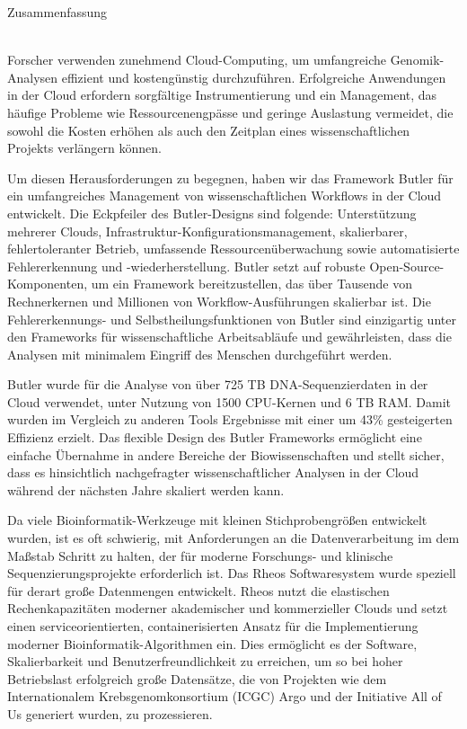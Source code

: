 \begin{Huge}
Zusammenfassung
\end{Huge}\\[1cm]
\noindent
Forscher verwenden zunehmend Cloud-Computing, um umfangreiche Genomik-Analysen effizient und kostengünstig durchzuführen. Erfolgreiche Anwendungen  in der Cloud erfordern sorgfältige Instrumentierung und ein Management, das häufige Probleme wie Ressourcenengpässe und geringe Auslastung vermeidet, die sowohl die Kosten erhöhen als auch den Zeitplan eines wissenschaftlichen Projekts verlängern können.

Um diesen Herausforderungen zu begegnen, haben wir das Framework Butler für ein umfangreiches Management von wissenschaftlichen Workflows in der Cloud entwickelt. Die Eckpfeiler des Butler-Designs sind folgende: Unterstützung mehrerer Clouds, Infrastruktur-Konfigurationsmanagement, skalierbarer, fehlertoleranter Betrieb, umfassende Ressourcenüberwachung sowie automatisierte Fehlererkennung und -wiederherstellung. Butler setzt auf robuste Open-Source-Komponenten, um ein Framework bereitzustellen, das über Tausende von Rechnerkernen und Millionen von Workflow-Ausführungen skalierbar ist. Die Fehlererkennungs- und Selbstheilungsfunktionen von Butler sind einzigartig unter den Frameworks für wissenschaftliche Arbeitsabläufe und gewährleisten, dass die Analysen mit minimalem Eingriff des Menschen durchgeführt werden.

Butler wurde für die Analyse von über 725 TB DNA-Sequenzierdaten in der Cloud verwendet, unter Nutzung von 1500 CPU-Kernen und 6 TB RAM. Damit wurden im Vergleich zu anderen Tools Ergebnisse mit einer um 43\% gesteigerten Effizienz erzielt. Das flexible Design des Butler Frameworks ermöglicht eine einfache Übernahme in andere Bereiche der Biowissenschaften und stellt sicher, dass es hinsichtlich nachgefragter wissenschaftlicher Analysen in der Cloud während der nächsten Jahre skaliert werden kann.

Da viele Bioinformatik-Werkzeuge mit kleinen Stichprobengrößen entwickelt wurden, ist es oft schwierig, mit Anforderungen an die Datenverarbeitung im dem Maßstab Schritt zu halten, der für moderne Forschungs- und klinische Sequenzierungsprojekte erforderlich ist. Das Rheos Softwaresystem wurde speziell für derart große Datenmengen entwickelt. Rheos nutzt die elastischen Rechenkapazitäten moderner akademischer und kommerzieller Clouds und setzt einen serviceorientierten, containerisierten Ansatz für die Implementierung moderner Bioinformatik-Algorithmen ein. Dies ermöglicht es der Software, Skalierbarkeit und Benutzerfreundlichkeit zu erreichen, um so bei hoher Betriebslast erfolgreich große Datensätze, die von Projekten wie dem Internationalem Krebsgenomkonsortium (ICGC) Argo und der Initiative All of Us generiert wurden, zu prozessieren.

